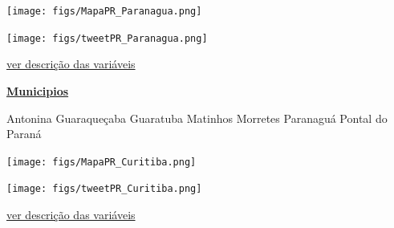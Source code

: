 \documentclass[10pt]{article} %
\begin{document}

\begin{minipage}[t]{.66\linewidth}
\hypertarget{Prng}{}
\texttt{[image: figs/MapaPR\_Paranagua.png]}\vspace{0.5cm}\vspace{0.5cm}\begin{center}
\texttt{[image: figs/tweetPR\_Paranagua.png]}\end{center}
\begin{center}

\end{center}
\small{\hyperlink{vartab}{ver descrição das variáveis}}\end{minipage}\hfill\begin{minipage}[t]{.30\linewidth}
\begin{mdframed}[style=sidebar,frametitle={}]
\textbf{\hyperlink{municips}{Municipios}}\begin{itemize}\gsquare Antonina 
\gsquare Guaraqueçaba 
\gsquare Guaratuba 
\gsquare Matinhos 
\gsquare Morretes 
\gsquare Paranaguá 
\gsquare Pontal do Paraná 
\end{itemize}\BackToContents\end{mdframed}\hfill\end{minipage}\newpage\begin{minipage}[t]{.66\linewidth}
\hypertarget{Crtb}{}
\texttt{[image: figs/MapaPR\_Curitiba.png]}\vspace{0.5cm}\vspace{0.5cm}\begin{center}
\texttt{[image: figs/tweetPR\_Curitiba.png]}\end{center}
\begin{center}

\end{center}
\small{\hyperlink{vartab}{ver descrição das variáveis}}\end{minipage}\hfill\begin{minipage}[t]{.30\linewidth}

\end{minipage}
\end{document}
